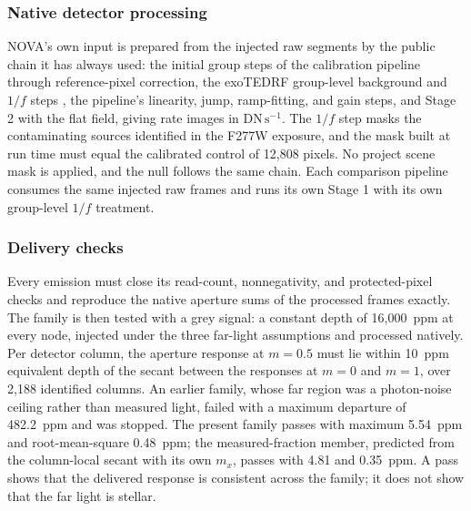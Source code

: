 \subsubsection{Native detector processing}


NOVA's own input is prepared from the injected raw segments by the public
chain it has always used: the initial group steps of the calibration
pipeline \citep{JWSTPipeline2025} through reference-pixel correction,
the exoTEDRF group-level background and $1/f$ steps \citep{Radica2024},
the pipeline's linearity, jump, ramp-fitting, and gain steps, and
Stage 2 with the flat field, giving rate images in
$\mathrm{DN\,s^{-1}}$. The $1/f$ step masks the
contaminating sources identified in the F277W exposure, and the mask
built at run time must equal the calibrated control of 12{,}808 pixels.
No project scene mask is applied, and the null follows the same chain.
Each comparison pipeline consumes the same injected raw frames and runs
its own Stage 1 with its own group-level $1/f$ treatment.

\subsubsection{Delivery checks}


Every emission must close its read-count, nonnegativity, and
protected-pixel checks and reproduce the native aperture sums of the
processed frames exactly. The family is then tested with a grey signal:
a constant depth of 16{,}000~ppm at every node, injected under the three
far-light assumptions and processed natively. Per detector column, the
aperture response at $m=0.5$ must lie within 10~ppm equivalent depth of
the secant between the responses at $m=0$ and $m=1$, over 2{,}188
identified columns. An earlier family, whose far region was a
photon-noise ceiling rather than measured light, failed with a maximum
departure of 482.2~ppm and was stopped. The present family passes with
maximum 5.54~ppm and root-mean-square 0.48~ppm; the measured-fraction
member, predicted from the column-local secant with its own $m_x$,
passes with 4.81 and 0.35~ppm. A pass shows that the delivered response
is consistent across the family; it does not show that the far light is
stellar.

